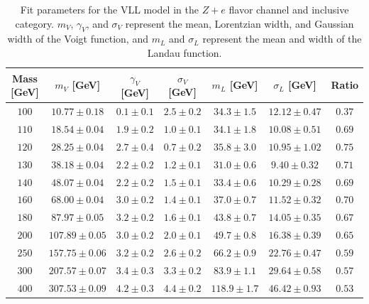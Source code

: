 \begin{appendices}
\begin{table}[h]
 \centering
\scriptsize
\begin{tabular}{|c||c|c|c|c|c|c|} 
\hline\hline
Mass [GeV] & $m_V$ [GeV] &  $\gamma_V$ [GeV] &  $\sigma_V$ [GeV] & $m_L$  [GeV] & $\sigma_L$ [GeV] & Ratio\\
\hline \hline
$100$&$10.77\pm0.18 $&$ 0.1\pm0.1 $&$ 2.5\pm0.2 $&$ 34.3\pm1.5 $&$ 12.12\pm0.47$&$0.37$\\ 
$110$&$18.54\pm0.04 $&$ 1.9\pm0.2 $&$ 1.0\pm0.1 $&$ 34.1\pm1.8 $&$ 10.08\pm0.51$&$0.69$\\ 
$120$&$28.25\pm0.04 $&$ 2.7\pm0.4 $&$ 0.7\pm0.2 $&$ 35.8\pm3.0 $&$ 10.95\pm1.02$&$0.75$ \\ 
$130$&$38.18\pm0.04 $&$ 2.2\pm0.2 $&$ 1.2\pm0.1$&$ 31.0\pm0.6 $&$ 9.40\pm0.32$&$0.71$ \\ 
$140$&$48.07\pm0.04 $&$ 2.2\pm0.2 $&$ 1.5\pm0.1 $&$ 33.4\pm0.6 $&$ 10.29\pm0.28$&$0.69$ \\ 
$160$&$68.00\pm0.04 $&$ 3.0\pm0.2 $&$ 1.4\pm0.1 $&$ 37.0\pm0.7 $&$ 11.52\pm0.32$&$0.70$ \\ 
$180$&$87.97\pm0.05 $&$ 3.2\pm0.2 $&$ 1.6\pm0.1 $&$ 43.8\pm0.7 $&$ 14.05\pm0.35$&$0.67$ \\ 
$200$&$107.89\pm0.05 $&$ 3.0\pm0.2 $&$ 2.0\pm0.1 $&$ 49.7\pm0.8 $&$ 16.38\pm0.39$&$0.65$ \\ 
$250$&$157.75\pm0.06 $&$ 3.2\pm0.2 $&$ 2.6\pm0.2 $&$ 66.2\pm0.9 $&$ 22.76\pm0.47$&$0.59$ \\ 
$300$&$207.57\pm0.07 $&$ 3.4\pm0.3 $&$ 3.3\pm0.2 $&$ 83.9\pm1.1 $&$ 29.64\pm0.58$&$0.57$ \\ 
$400$&$307.53\pm0.09 $&$ 4.2\pm0.3 $&$ 4.4\pm0.2 $&$ 118.9\pm1.7 $&$ 46.42\pm0.93$&$0.53$ \\ 
 \hline\hline
\end{tabular} 
\caption{Fit parameters for the VLL model in the $Z+e$ flavor channel and inclusive category. $m_V$, $\gamma_V$, and $\sigma_V$ represent the mean, Lorentzian width, and Gaussian width of the Voigt function, and $m_L$ and $\sigma_L$ represent the mean and width of the Landau function.}

   \label{table:ZeFitParamsVLL}
\end{table}



\end{appendices}
